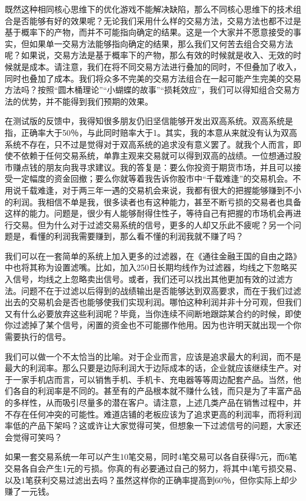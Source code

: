 既然这种相同核心思维下的优化游戏不能解决缺陷，那么不同核心思维下的技术组合是否能够有好的效果呢？无论我们采用什么样的交易方法，交易方法也都不过是基于概率下的产物，而并不可能指向确定的结果。这是一个大家并不愿意接受的事实，但如果单一交易方法能够指向确定的结果，那么我们又何苦去组合交易方法呢？如果说，交易方法是基于概率下的产物，那么有效的时候就是收入、无效的时候就是成本。请注意，我们在将不同交易方法进行叠加的同时，不但叠加了收入，同时也叠加了成本。我们将众多不完美的交易方法组合在一起可能产生完美的交易方法吗？按照“圆木桶理论”“小蝴蝶的故事”“损耗效应”，我们可以得知组合交易方法的优势，并不能得到我们预期的效果。

在测试版的反馈中，我得知很多朋友仍旧坚信能够开发出双高系统。双高系统是指，正确率大于50％，与此同时赔率大于1。其实，我的本意从来就没有认为双高系统不存在，只不过是觉得对于双高系统的追求没有意义罢了。就我个人而言，即使不依赖于任何交易系统，单靠主观来交易就可以得到双高的战绩。一位想通过股市赚点钱的朋友向我寻求建议。我的答复是：要么你投资于期货市场，并且可以接受一定幅度的资金回撤；要么你就等着我告诉你股市中“千载难逢”的交易机会。不用说千载难逢，对于两三年一遇的交易机会来说，我都有很大的把握能够赚到不小的利润。我相信不单是我，很多读者也有这种能力，甚至不断亏损的交易者也具备这样的能力。问题是，很少有人能够耐得住性子，等待自己有把握的市场机会再进行交易。但为什么对于过滤交易系统的信号，更多的人却又乐此不疲呢？另一个问题是，看懂的利润我需要赚到，那么看不懂的利润我就不赚了吗？

我们可以在一套简单的系统上加入更多的过滤器，在《通往金融王国的自由之路》中也将其称为设置滤嘴。比如，加入250日长期均线作为过滤器，均线之下忽略买入信号，均线之上忽略卖出信号。或者，我们还可以找出其他更加有效的过滤方法。问题不在于过滤以后得到的战绩输出是否能够达到双高要求，而在于我们过滤出去的交易机会是否也能够使我们实现利润。哪怕这种利润并非十分可观，但我们又有什么必要放弃这些利润呢？毕竟，当你连续不间断地跟踪某合约的时候，即使你过滤掉了某个信号，闲置的资金也不可能挪作他用。因为也许明天就出现一个你需要执行的信号。

我们可以做一个不太恰当的比喻。对于企业而言，应该是追求最大的利润，而不是最大的利润率。那么只要是边际利润大于边际成本的话，企业就应该继续生产。对于一家手机店而言，可以销售手机、手机卡、充电器等等周边配套产品。当然，他们各自的利润率是不同的。甚至有的产品根本就不赚什么钱，而只是为了丰富产品的多样性，从而吸引尽量多的潜在客户。请注意，上述几类产品在销售过程中，并不存在任何冲突的可能性。难道店铺的老板应该为了追求更高的利润率，而将利润率低的产品下架吗？这或许让大家觉得可笑，但想象一下过滤信号的问题，大家还会觉得可笑吗？

如果一套交易系统一年可以产生10笔交易，同时4笔交易可以各自获得5元，而6笔交易各自会产生1元的亏损。你真的有必要通过自己的努力，将其中4笔亏损交易、以及1笔获利交易过滤出去吗？虽然这样你的正确率提高到60％，但你实际上却少赚了一元钱。

